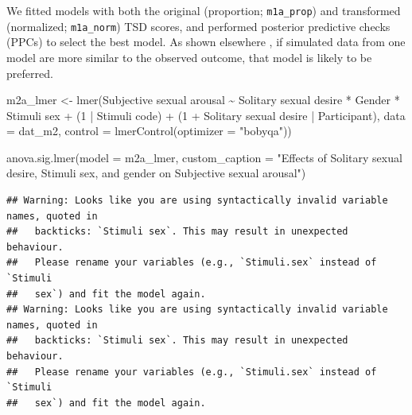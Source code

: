\documentclass[
  bookmarksnumbered]{article}
\newenvironment{Shaded}{\begin{snugshade}}{\end{snugshade}}
\newcommand{\AttributeTok}[1]{\textcolor[rgb]{0.80,0.80,0.80}{#1}}
\newcommand{\DecValTok}[1]{\textcolor[rgb]{0.86,0.86,0.80}{#1}}
\newcommand{\FunctionTok}[1]{\textcolor[rgb]{0.94,0.94,0.56}{#1}}
\newcommand{\NormalTok}[1]{\textcolor[rgb]{0.80,0.80,0.80}{#1}}
\newcommand{\OtherTok}[1]{\textcolor[rgb]{0.94,0.94,0.56}{#1}}
\newcommand{\SpecialCharTok}[1]{\textcolor[rgb]{0.86,0.64,0.64}{#1}}
\newcommand{\StringTok}[1]{\textcolor[rgb]{0.80,0.58,0.58}{#1}}
\begin{document}
We fitted models with both the original (proportion; \texttt{m1a\_prop}) and transformed (normalized; \texttt{m1a\_norm}) TSD scores, and performed posterior predictive checks (PPCs) to select the best model. As shown elsewhere \autocite[e.g.,][]{gabryVisualizationBayesianWorkflow2019}, if simulated data from one model are more similar to the observed outcome, that model is likely to be preferred.

\begin{Shaded}
\begin{Highlighting}[]
\NormalTok{m2a\_lmer }\OtherTok{\textless{}{-}} \FunctionTok{lmer}\NormalTok{(}\StringTok{\textasciigrave{}}\AttributeTok{Subjective sexual arousal}\StringTok{\textasciigrave{}} \SpecialCharTok{\textasciitilde{}} 
              \StringTok{\textasciigrave{}}\AttributeTok{Solitary sexual desire}\StringTok{\textasciigrave{}} \SpecialCharTok{*}\NormalTok{ Gender }\SpecialCharTok{*} \StringTok{\textasciigrave{}}\AttributeTok{Stimuli sex}\StringTok{\textasciigrave{}} \SpecialCharTok{+}
\NormalTok{              (}\DecValTok{1} \SpecialCharTok{|} \StringTok{\textasciigrave{}}\AttributeTok{Stimuli code}\StringTok{\textasciigrave{}}\NormalTok{) }\SpecialCharTok{+}
\NormalTok{              (}\DecValTok{1} \SpecialCharTok{+} \StringTok{\textasciigrave{}}\AttributeTok{Solitary sexual desire}\StringTok{\textasciigrave{}} \SpecialCharTok{|}\NormalTok{ Participant),}
            \AttributeTok{data =}\NormalTok{ dat\_m2,}
            \AttributeTok{control =} \FunctionTok{lmerControl}\NormalTok{(}\AttributeTok{optimizer =} \StringTok{"bobyqa"}\NormalTok{))}
\end{Highlighting}
\end{Shaded}

\begin{Shaded}
\begin{Highlighting}[]
\FunctionTok{anova.sig.lmer}\NormalTok{(}\AttributeTok{model =}\NormalTok{ m2a\_lmer, }
               \AttributeTok{custom\_caption =} \StringTok{"Effects of Solitary sexual desire, Stimuli sex, and gender }
\StringTok{               on Subjective sexual arousal"}\NormalTok{)}
\end{Highlighting}
\end{Shaded}

\begin{verbatim}
## Warning: Looks like you are using syntactically invalid variable names, quoted in
##   backticks: `Stimuli sex`. This may result in unexpected behaviour.
##   Please rename your variables (e.g., `Stimuli.sex` instead of `Stimuli
##   sex`) and fit the model again.
## Warning: Looks like you are using syntactically invalid variable names, quoted in
##   backticks: `Stimuli sex`. This may result in unexpected behaviour.
##   Please rename your variables (e.g., `Stimuli.sex` instead of `Stimuli
##   sex`) and fit the model again.
\end{verbatim}
\end{document}
